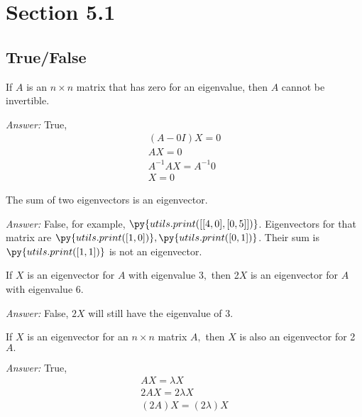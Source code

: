 \documentclass[letterpaper]{article}
\newcommand{\ans}{\textit{Answer: }}
\newenvironment{question}[2][Question]{\begin{trivlist}
\item[\hskip \labelsep {\bfseries #1}\hskip \labelsep {\bfseries #2.}]}{\end{trivlist}}
\begin{document}
\section{Section 5.1}
\subsection{True/False}

\begin{question}{5.1}
  If $A$ is an $n \times n$ matrix that has zero for an eigenvalue, then $A$ cannot be invertible.

  \ans True, 
  \begin{gather*}
    (A - 0I)X = 0 \\
    AX = 0 \\
    A^{-1}AX = A^{-1} 0 \\
    X = 0
  \end{gather*}
  
\end{question}

\begin{question}{5.4}
  The sum of two eigenvectors is an eigenvector.

  \ans False, for example, $\py{utils.print([[4, 0], [0, 5]])}$. Eigenvectors for that matrix 
  are $\py{utils.print([1, 0])}, \py{utils.print([0, 1])}$. Their sum is $\py{utils.print([1, 1])}$ is 
  not an eigenvector.
  
\end{question}

\begin{question}{5.5}
  If $X$ is an eigenvector for $A$ with eigenvalue $3,$ then 2$X$ is an eigenvector for $A $
  with eigenvalue $6 . $

  \ans False, $2X$ will still have the eigenvalue of 3. 
  
\end{question}

\begin{question}{5.6}
  If $X$ is an eigenvector for an $n \times n$ matrix $A,$ then $X$ is also an eigenvector for
  2$A . $

  \ans True, 
  \begin{gather*}
    AX = \lambda X \\
    2AX = 2\lambda X \\
    (2A)X = (2\lambda) X
  \end{gather*}
  
\end{question}
\end{document}
